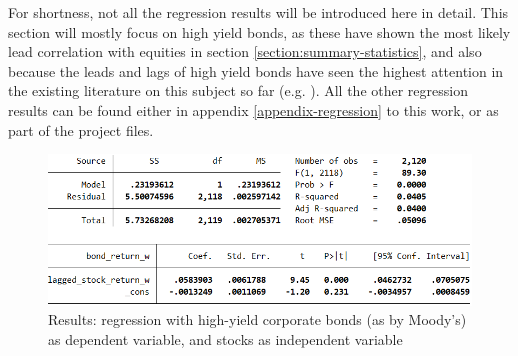 For shortness, not all the regression results will be introduced here in detail. This section will mostly focus on high yield bonds, as these have shown the most likely lead correlation with equities in section \ref{section:summary-statistics}, and also because the leads and lags of high yield bonds have seen the highest attention in the existing literature on this subject so far (e.g. \cite{lead-lag-source}). All the other regression results can be found either in appendix \ref{appendix-regression} to this work, or as part of the project files. 

\begin{figure}[h]
	\centering
	\includegraphics[trim={0 0 0 0},clip,width=1.0\linewidth]{figures/regression-results/regression-high-yield-ccc-d-moodies-bonds-as-dependent.PNG}
	\caption{Results: regression with high-yield corporate bonds (as by Moody's) as dependent variable, and stocks as independent variable}
	\label{fig:regression-high-yield-ccc-d-moodies-bonds-as-dependent.PNG}
\end{figure}

